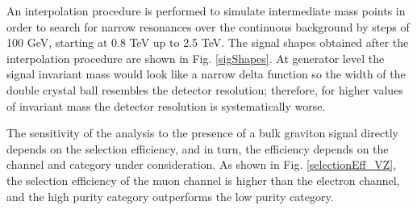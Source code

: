 An interpolation procedure is performed to simulate intermediate mass points in order to search for narrow resonances over the continuous background by steps of 100 GeV, starting at 0.8 TeV up to 2.5 TeV. The signal shapes obtained after the interpolation procedure are shown in Fig. \ref{sigShapes}. At generator level the signal invariant mass would look like a narrow delta function so the width of the double crystal ball resembles the detector resolution; therefore, for higher values of invariant mass the detector resolution is systematically worse. 

The sensitivity of the analysis to the presence of a bulk graviton signal directly depends on the selection efficiency, and in turn, the efficiency depends on the channel and category under consideration. As shown in Fig. \ref{selectionEff_VZ}, the selection efficiency of the muon channel is higher than the electron channel, and the high purity category outperforms the low purity category. 

